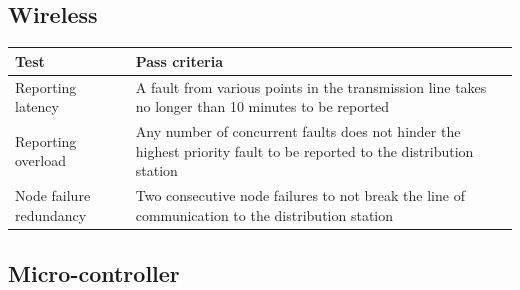 \documentclass[12pt]{article}
\begin{document}
\subsection{Wireless}
\begin{center}
  \begin{table}[!htb]
    
    \hskip-2.2cm\begin{tabular}{|p{8cm}|p{10cm}|}
        \hline
        \textbf{Test} & \textbf{Pass criteria} \\
        \hline

        Reporting latency & A fault from various points in the transmission line takes no longer than 10 minutes to be
        reported \\[0.3cm]
        Reporting overload & Any number of concurrent faults does not hinder the highest priority fault to be reported to
        the distribution station \\[0.3cm]
        Node failure redundancy & Two consecutive node failures to not break the line of communication to the
        distribution station \\[0.3cm]


        \hline

      \end{tabular}    
      
      \label{tab:summary_measurments}
     \end{table}
  \end{center}

\subsection{Micro-controller}
\end{document}
